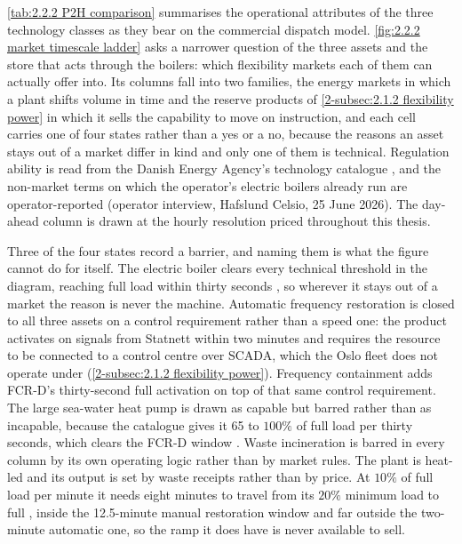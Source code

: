 \autoref{tab:2.2.2 P2H comparison} summarises the operational attributes of the three technology classes as they bear on the commercial dispatch model. \autoref{fig:2.2.2 market timescale ladder} asks a narrower question of the three assets and the store that acts through the boilers: which flexibility markets each of them can actually offer into. Its columns fall into two families, the energy markets in which a plant shifts volume in time and the reserve products of \autoref{2-subsec:2.1.2 flexibility power} in which it sells the capability to move on instruction, and each cell carries one of four states rather than a yes or a no, because the reasons an asset stays out of a market differ in kind and only one of them is technical. Regulation ability is read from the Danish Energy Agency's technology catalogue \cite{danish_energy_agency_technology_2024}, and the non-market terms on which the operator's electric boilers already run are operator-reported (operator interview, Hafslund Celsio, 25 June 2026). The day-ahead column is drawn at the hourly resolution priced throughout this thesis.

Three of the four states record a barrier, and naming them is what the figure cannot do for itself. The electric boiler clears every technical threshold in the diagram, reaching full load within thirty seconds \cite{danish_energy_agency_technology_2024}, so wherever it stays out of a market the reason is never the machine. Automatic frequency restoration is closed to all three assets on a control requirement rather than a speed one: the product activates on signals from Statnett within two minutes and requires the resource to be connected to a control centre over SCADA, which the Oslo fleet does not operate under (\autoref{2-subsec:2.1.2 flexibility power}). Frequency containment adds FCR-D's thirty-second full activation on top of that same control requirement. The large sea-water heat pump is drawn as capable but barred rather than as incapable, because the catalogue gives it 65 to $100\%$ of full load per thirty seconds, which clears the FCR-D window \cite{danish_energy_agency_technology_2024}. Waste incineration is barred in every column by its own operating logic rather than by market rules. The plant is heat-led and its output is set by waste receipts rather than by price. At $10\%$ of full load per minute it needs eight minutes to travel from its $20\%$ minimum load to full \cite{danish_energy_agency_technology_2024}, inside the 12.5-minute manual restoration window and far outside the two-minute automatic one, so the ramp it does have is never available to sell.

